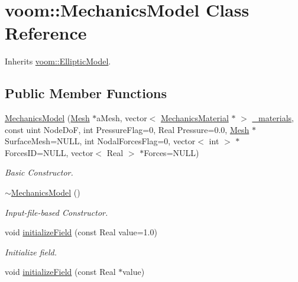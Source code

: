\hypertarget{classvoom_1_1_mechanics_model}{
\section{voom::MechanicsModel Class Reference}
\label{classvoom_1_1_mechanics_model}
}


Inherits \hyperlink{classvoom_1_1_elliptic_model}{voom::EllipticModel}.\subsection*{Public Member Functions}
\begin{DoxyCompactItemize}
\item 
\hyperlink{classvoom_1_1_mechanics_model_a31aa527928bf219f41a69c390e75ee4f}{MechanicsModel} (\hyperlink{classvoom_1_1_mesh}{Mesh} $\ast$aMesh, vector$<$ \hyperlink{classvoom_1_1_mechanics_material}{MechanicsMaterial} $\ast$ $>$ \hyperlink{classvoom_1_1_mechanics_model_abdba86a197a3e053f7fc3d98a4c35e8d}{\_\-materials}, const uint NodeDoF, int PressureFlag=0, Real Pressure=0.0, \hyperlink{classvoom_1_1_mesh}{Mesh} $\ast$SurfaceMesh=NULL, int NodalForcesFlag=0, vector$<$ int $>$ $\ast$ForcesID=NULL, vector$<$ Real $>$ $\ast$Forces=NULL)
\begin{DoxyCompactList}\small\item\em Basic Constructor. \item\end{DoxyCompactList}\item 
\hyperlink{classvoom_1_1_mechanics_model_a39cab4fab5f26d8bf83e63a6d91e33f6}{$\sim$MechanicsModel} ()
\begin{DoxyCompactList}\small\item\em Input-\/file-\/based Constructor. \item\end{DoxyCompactList}\item 
\hypertarget{classvoom_1_1_mechanics_model_a5315460244606255a586557fcd8d3020}{
void \hyperlink{classvoom_1_1_mechanics_model_a5315460244606255a586557fcd8d3020}{initializeField} (const Real value=1.0)}
\label{classvoom_1_1_mechanics_model_a5315460244606255a586557fcd8d3020}

\begin{DoxyCompactList}\small\item\em Initialize field. \item\end{DoxyCompactList}\item 
\hypertarget{classvoom_1_1_mechanics_model_a00dcb774c75d337aea3a3396d2ce15f5}{
void \hyperlink{classvoom_1_1_mechanics_model_a00dcb774c75d337aea3a3396d2ce15f5}{initializeField} (const Real $\ast$value)}
\label{classvoom_1_1_mechanics_model_a00dcb774c75d337aea3a3396d2ce15f5}


\end{DoxyCompactItemize}
